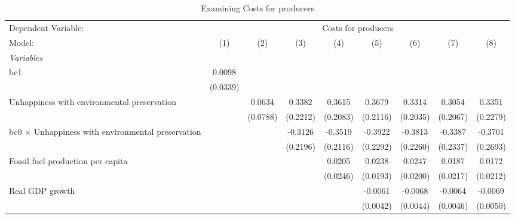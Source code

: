 
\begin{table}[htbp]
   \caption{Examining Costs for producers}
   \centering
   \begin{tabular}{lcccccccc}
      \tabularnewline \midrule \midrule
      Dependent Variable: & \multicolumn{8}{c}{Costs for producers}\\
      Model:                                                    & (1)      & (2)      & (3)      & (4)      & (5)      & (6)      & (7)            & (8)\\  
      \midrule
      \emph{Variables}\\
      bc1                                                       & 0.0098   &          &          &          &          &          &                &   \\   
                                                                & (0.0339) &          &          &          &          &          &                &   \\   
      Unhappiness with environmental preservation               &          & 0.0634   & 0.3382   & 0.3615   & 0.3679   & 0.3314   & 0.3054         & 0.3351\\   
                                                                &          & (0.0788) & (0.2212) & (0.2083) & (0.2116) & (0.2035) & (0.2067)       & (0.2279)\\   
      bc0 $\times$ Unhappiness with environmental preservation  &          &          & -0.3126  & -0.3519  & -0.3922  & -0.3813  & -0.3387        & -0.3701\\   
                                                                &          &          & (0.2196) & (0.2116) & (0.2292) & (0.2260) & (0.2337)       & (0.2693)\\   
      Fossil fuel production per capita                         &          &          &          & 0.0205   & 0.0238   & 0.0247   & 0.0187         & 0.0172\\   
                                                                &          &          &          & (0.0246) & (0.0193) & (0.0200) & (0.0217)       & (0.0212)\\   
      Real GDP growth                                           &          &          &          &          & -0.0061  & -0.0068  & -0.0064        & -0.0069\\   
                                                                &          &          &          &          & (0.0042) & (0.0044) & (0.0046)       & (0.0050)\\   

\end{tabular}
\end{table}
